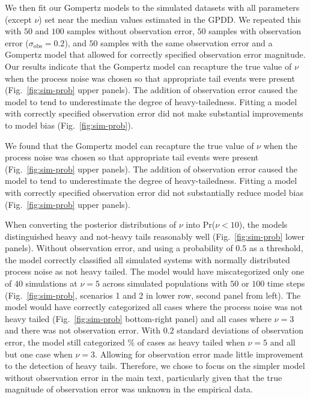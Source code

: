 \documentclass[12pt]{article}
\begin{document}
We then fit our Gompertz models to the simulated datasets with all parameters
(except $\nu$) set near the median values estimated in the GPDD. We repeated
this with $50$ and $100$ samples without observation error, $50$ samples with
observation error ($\sigma_\mathrm{obs} = 0.2$), and $50$ samples with the
same observation error and a Gompertz model that allowed for correctly
specified observation error magnitude. Our results indicate that the Gompertz
model can recapture the true value of $\nu$ when the process noise was chosen
so that appropriate tail events were present (Fig.~\ref{fig:sim-prob} upper panels).
The addition of observation error caused the
model to tend to underestimate the degree of heavy-tailedness. Fitting a model
with correctly specified observation error did not make substantial
improvements to model bias (Fig.~\ref{fig:sim-prob}).

We found that the Gompertz model can recapture
the true value of \(\nu\) when the process noise was chosen so that appropriate
tail events were present (Fig.~\ref{fig:sim-prob} upper panels). The addition
of observation error caused the model to tend to underestimate the degree of
heavy-tailedness. Fitting a model with correctly specified observation error
did not substantially reduce model bias (Fig.~\ref{fig:sim-prob} upper panels).

When converting the posterior distributions of $\nu$ into Pr($\nu < 10$), the
models distinguished heavy and not-heavy tails reasonably well (Fig.~\ref{fig:sim-prob} lower panels).
Without observation error, and using a
probability of $0.5$ as a threshold, the model correctly classified all
simulated systems with normally distributed process noise as not heavy tailed.
The model would have miscategorized only one of $40$ simulations at $\nu = 5$
across simulated populations with $50$ or $100$ time steps
(Fig.~\ref{fig:sim-prob}, scenarios 1 and 2 in lower row, second panel from left).
The model would have correctly categorized all cases where the process noise
was not heavy tailed (Fig.~\ref{fig:sim-prob} bottom-right panel) and all cases
where $\nu = 3$ and there was not observation error. With $0.2$ standard
deviations of observation error, the model still categorized
\obsErrorNuFivePerc\% of cases as heavy tailed when $\nu = 5$ and all but one
case when $\nu = 3$. Allowing for observation error made little improvement to
the detection of heavy tails. Therefore, we chose to focus on the simpler model
without observation error in the main text, particularly given that the true
magnitude of observation error was unknown in the empirical data.
\end{document}
